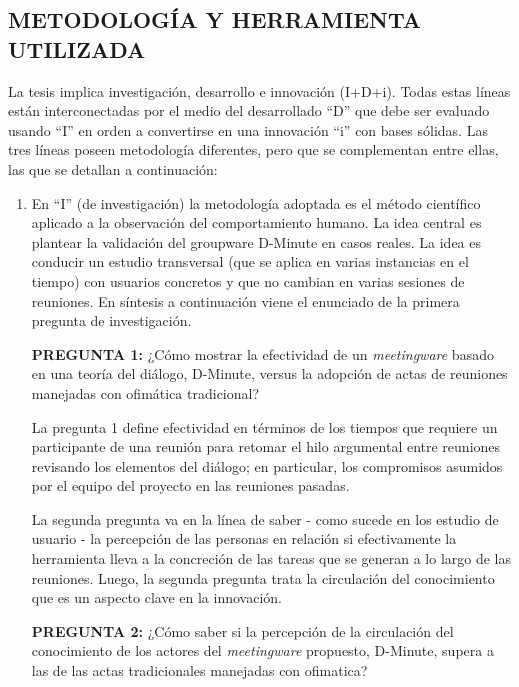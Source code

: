 \subsection{METODOLOGÍA Y HERRAMIENTA UTILIZADA}

La tesis implica investigación, desarrollo e innovación (I+D+i). Todas estas líneas están interconectadas por el medio del desarrollado “D” que debe ser evaluado usando “I” en orden a convertirse en una innovación “i” con bases sólidas. Las tres líneas poseen metodología diferentes, pero que se complementan entre ellas, las que se detallan a continuación:

\begin{enumerate}[A]
        \item En “I” (de investigación) la metodología adoptada es el método científico aplicado a la observación del comportamiento humano. La idea central es plantear la validación del groupware D-Minute en casos reales. La idea es conducir un estudio transversal (que se aplica en varias instancias en el tiempo) con usuarios concretos y que no cambian en varias sesiones de reuniones. En síntesis a continuación viene el enunciado de la primera pregunta de investigación.\newline
        
\textbf{PREGUNTA 1:} ¿Cómo mostrar la efectividad de un \textsl{meetingware} basado en una teoría del diálogo, D-Minute, versus la adopción de actas de reuniones manejadas con ofimática tradicional?\newline

La pregunta 1 define efectividad en términos de los tiempos que requiere un participante de una reunión para retomar el hilo argumental entre reuniones revisando los elementos del diálogo; en particular, los compromisos asumidos por el equipo del proyecto en las reuniones pasadas.\newline 

La segunda pregunta va en la línea de saber - como sucede en los estudio de usuario - la percepción de las personas en relación si efectivamente la herramienta lleva a la concreción de las tareas que se generan a lo largo de las reuniones. Luego, la segunda pregunta trata la circulación del conocimiento que es un aspecto clave en la innovación.\newline

\textbf{PREGUNTA 2:} ¿Cómo saber si la percepción de la circulación del conocimiento de los actores del \textsl{meetingware} propuesto, D-Minute, supera a las de las actas tradicionales manejadas con ofimatica?
        

\end{enumerate}
